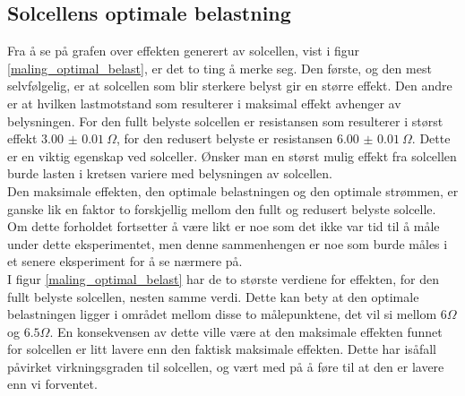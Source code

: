 \documentclass[%
 reprint,
 amsmath,amssymb,
 aps,
 norsk,
 booktabs
]{revtex4-1}
\begin{document}
\subsection{Solcellens optimale belastning}
Fra å se på grafen over effekten generert av solcellen, vist i figur \vref{maling_optimal_belast}, er det to ting å merke seg. Den første, og den mest selvfølgelig, er at solcellen som blir sterkere belyst gir en større effekt. Den andre er at hvilken lastmotstand som resulterer i maksimal effekt avhenger av belysningen. For den fullt belyste solcellen er resistansen som resulterer i størst effekt $\SI{3.00(1)}{\Omega}$, for den redusert belyste er resistansen $\SI{6.00(1)}{\Omega}$. Dette er en viktig egenskap ved solceller. Ønsker man en størst mulig effekt fra solcellen burde lasten i kretsen variere med belysningen av solcellen.
\\Den maksimale effekten, den optimale belastningen og den optimale strømmen, er ganske lik en faktor to forskjellig mellom den fullt og redusert belyste solcelle. Om dette forholdet fortsetter å være likt er noe som det ikke var tid til å måle under dette eksperimentet, men denne sammenhengen er noe som burde måles i et senere eksperiment for å se nærmere på.\\
I figur \vref{maling_optimal_belast} har de to største verdiene for effekten, for den fullt belyste solcellen, nesten samme verdi. Dette kan bety at den optimale belastningen ligger i området mellom disse to målepunktene, det vil si mellom $6\Omega$ og $6.5\Omega$. En konsekvensen av dette ville være at den maksimale effekten funnet for solcellen er litt lavere enn den faktisk maksimale effekten. Dette har isåfall påvirket virkningsgraden til solcellen, og vært med på å føre til at den er lavere enn vi forventet.
\end{document}
